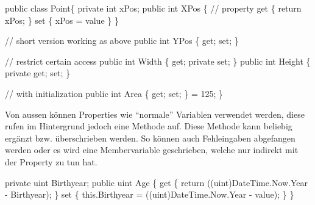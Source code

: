 \documentclass[
  9pt,
  a4paperpaper,
  DIV=11]{scrartcl}
\newenvironment{Shaded}{}{}
\newcommand{\CommentTok}[1]{\textcolor[rgb]{0.42,0.45,0.49}{#1}}
\newcommand{\DataTypeTok}[1]{\textcolor[rgb]{0.84,0.23,0.29}{#1}}
\newcommand{\DecValTok}[1]{\textcolor[rgb]{0.00,0.36,0.77}{#1}}
\newcommand{\FunctionTok}[1]{\textcolor[rgb]{0.44,0.26,0.76}{#1}}
\newcommand{\KeywordTok}[1]{\textcolor[rgb]{0.84,0.23,0.29}{#1}}
\newcommand{\NormalTok}[1]{\textcolor[rgb]{0.14,0.16,0.18}{#1}}
\newcommand{\OperatorTok}[1]{\textcolor[rgb]{0.14,0.16,0.18}{#1}}
\numberwithin{equation}{section}
\begin{document}
\begin{multicols}{2}
\begin{tcolorbox}
\begin{tcolorbox}
\begin{tcolorbox}
\begin{Shaded}
\begin{Highlighting}[]
\KeywordTok{public} \KeywordTok{class}\NormalTok{ Point}\OperatorTok{\{}
  \KeywordTok{private} \DataTypeTok{int}\NormalTok{ xPos}\OperatorTok{;}
  \KeywordTok{public} \DataTypeTok{int}\NormalTok{ XPos }\OperatorTok{\{}    \CommentTok{// property}
    \KeywordTok{get} \OperatorTok{\{} \KeywordTok{return}\NormalTok{ xPos}\OperatorTok{;} \OperatorTok{\}}
    \KeywordTok{set} \OperatorTok{\{}\NormalTok{ xPos }\OperatorTok{=}\NormalTok{ value }\OperatorTok{\}}
  \OperatorTok{\}}

  \CommentTok{// short version working as above}
  \KeywordTok{public} \DataTypeTok{int}\NormalTok{ YPos }\OperatorTok{\{} \KeywordTok{get}\OperatorTok{;} \KeywordTok{set}\OperatorTok{;} \OperatorTok{\}}

  \CommentTok{// restrict certain access}
  \KeywordTok{public} \DataTypeTok{int}\NormalTok{ Width }\OperatorTok{\{} \KeywordTok{get}\OperatorTok{;} \KeywordTok{private} \KeywordTok{set}\OperatorTok{;} \OperatorTok{\}}
  \KeywordTok{public} \DataTypeTok{int}\NormalTok{ Height }\OperatorTok{\{} \KeywordTok{private} \KeywordTok{get}\OperatorTok{;} \KeywordTok{set}\OperatorTok{;} \OperatorTok{\}}

  \CommentTok{// with initialization}
  \KeywordTok{public} \DataTypeTok{int}\NormalTok{ Area }\OperatorTok{\{} \KeywordTok{get}\OperatorTok{;} \KeywordTok{set}\OperatorTok{;} \OperatorTok{\}} \OperatorTok{=} \DecValTok{125}\OperatorTok{;}
\OperatorTok{\}}
\end{Highlighting}
\end{Shaded}

Von aussen können Properties wie ``normale'' Variablen verwendet werden,
diese rufen im Hintergrund jedoch eine Methode auf. Diese Methode kann
beliebig ergänzt bzw. überschrieben werden. So können auch Fehleingaben
abgefangen werden oder es wird eine Membervariable geschrieben, welche
nur indirekt mit der Property zu tun hat.

\begin{Shaded}
\begin{Highlighting}[]
\KeywordTok{private} \DataTypeTok{uint}\NormalTok{ Birthyear}\OperatorTok{;}
\KeywordTok{public} \DataTypeTok{uint}\NormalTok{ Age }\OperatorTok{\{}
  \KeywordTok{get} \OperatorTok{\{} 
    \KeywordTok{return} \OperatorTok{((}\DataTypeTok{uint}\OperatorTok{)}\NormalTok{DateTime}\OperatorTok{.}\FunctionTok{Now}\OperatorTok{.}\FunctionTok{Year} \OperatorTok{{-}}\NormalTok{ Birthyear}\OperatorTok{);} 
    \OperatorTok{\}}
  \KeywordTok{set} \OperatorTok{\{} 
    \KeywordTok{this}\OperatorTok{.}\FunctionTok{Birthyear} \OperatorTok{=} \OperatorTok{((}\DataTypeTok{uint}\OperatorTok{)}\NormalTok{DateTime}\OperatorTok{.}\FunctionTok{Now}\OperatorTok{.}\FunctionTok{Year} \OperatorTok{{-}}\NormalTok{ value}\OperatorTok{);} 
    \OperatorTok{\}}
\OperatorTok{\}}
\end{Highlighting}
\end{Shaded}


\end{tcolorbox}
\end{tcolorbox}
\end{tcolorbox}
\end{multicols}
\end{document}
